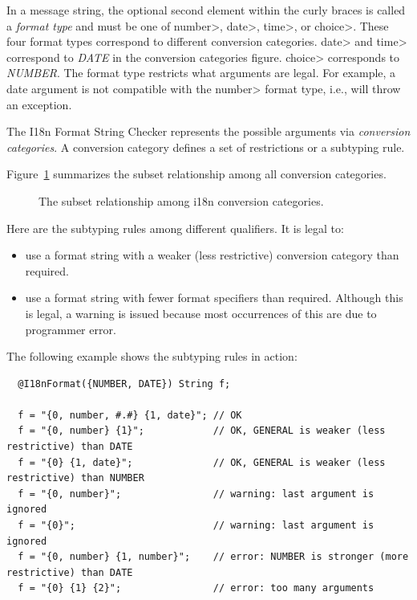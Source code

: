 
In a message string, the optional second element within the curly braces is
called a \emph{format type} and must be one of \<number>, \<date>,
\<time>, or \<choice>. These four format types correspond to different
conversion categories. \<date> and \<time> correspond to \emph{DATE} in the
conversion categories figure. \<choice> corresponds to \emph{NUMBER}.
The format type restricts what arguments are legal.
For example, a date argument is not compatible with
the \<number> format type, i.e.,  will throw an exception.

The I18n Format String Checker represents the possible arguments via \emph{conversion
  categories}.  A conversion category defines a set of restrictions or a
subtyping rule.

Figure~\ref{i18n-format-category} summarizes the subset
relationship among all conversion categories.

\begin{figure}
    \caption{The subset relationship among
        i18n
        conversion categories.}
    \label{i18n-format-category}
\end{figure}



Here are the subtyping rules among different
qualifiers.
It is legal to:

\begin{itemize}
\item use a format string with a weaker (less restrictive) conversion category than required.
\item use a format string with fewer format specifiers than required.
  Although this is legal, a warning is issued because most occurrences of
  this are due to programmer error.
\end{itemize}

The following example shows the subtyping rules in action:

\begin{Verbatim}
  @I18nFormat({NUMBER, DATE}) String f;

  f = "{0, number, #.#} {1, date}"; // OK
  f = "{0, number} {1}";            // OK, GENERAL is weaker (less restrictive) than DATE
  f = "{0} {1, date}";              // OK, GENERAL is weaker (less restrictive) than NUMBER
  f = "{0, number}";                // warning: last argument is ignored
  f = "{0}";                        // warning: last argument is ignored
  f = "{0, number} {1, number}";    // error: NUMBER is stronger (more restrictive) than DATE
  f = "{0} {1} {2}";                // error: too many arguments
\end{Verbatim}

